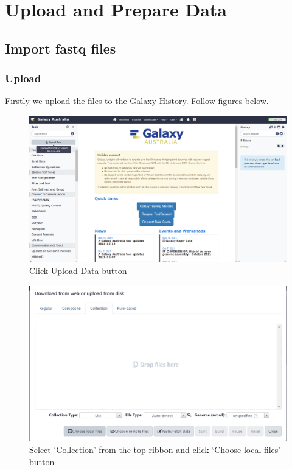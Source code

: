 \documentclass[
]{book}
\begin{document}
\hypertarget{upload-and-prepare-data}{%
\chapter{Upload and Prepare Data}\label{upload-and-prepare-data}}

\hypertarget{import-fastq-files}{%
\section{Import fastq files}\label{import-fastq-files}}

\hypertarget{upload}{%
\subsection{Upload}\label{upload}}

Firstly we upload the files to the Galaxy History. Follow figures below.

\begin{figure}

{\centering \includegraphics[width=1\linewidth]{images/image001} 

}

\caption{Click Upload Data button}\label{fig:chunk1}
\end{figure}

\begin{figure}

{\centering \includegraphics[width=1\linewidth]{images/image002} 

}

\caption{Select ‘Collection’ from the top ribbon and click ‘Choose local files’ button}\label{fig:chunk2}
\end{figure}
\end{document}
